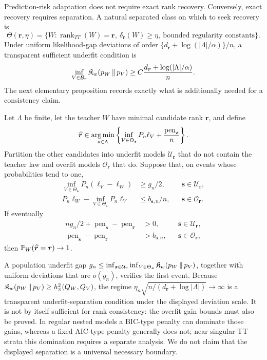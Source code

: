 Prediction-risk adaptation does not require exact rank recovery. Conversely,
exact recovery requires separation. A natural separated class on which to
seek recovery is
\[
\Theta(\bm r,\eta)=\{W:\operatorname{rank}_{TT}(W)=\bm r,
\ \delta_{\bm r}(W)\ge\eta,\ \text{bounded regularity constants}\}.
\]
Under uniform likelihood-gap deviations of order
\(\{d_{\bm r}+\log(|\Lambda|/\alpha)\}/n\), a transparent sufficient
underfit condition is
\[
\inf_{V\in\mathcal B_{\bm r}}\mathfrak K_w\!\left(p_W\,\middle\|\,p_V\right)
\ge C\frac{d_{\bm r}+\log(|\Lambda|/\alpha)}{n}.
\]
The next elementary proposition records exactly what is additionally needed
for a consistency claim.

\begin{proposition}
\label{prop:rank-sufficiency}
Let \(\Lambda\) be finite, let the teacher \(W\) have minimal candidate rank
\(\bm r\), and define
\[
 \widehat{\bm r}\in\operatorname*{arg\,min}_{\bm s\in\Lambda}
 \left\{\inf_{V\in\Theta_{\bm s}}P_n\ell_V
       +\frac{\operatorname{pen}_{\bm s}}n\right\}.
\]
Partition the other candidates into underfit models \(\mathcal U_{\bm r}\)
that do not contain the teacher law and overfit models
\(\mathcal O_{\bm r}\) that do.  Suppose that, on events whose probabilities
tend to one,
\begin{align*}
 \inf_{V\in\Theta_{\bm s}}P_n(\ell_V-\ell_W)&\ge g_n/2,
 &&\bm s\in\mathcal U_{\bm r},\\
 P_n\ell_W-\inf_{V\in\Theta_{\bm s}}P_n\ell_V&\le b_{\bm s,n}/n,
 &&\bm s\in\mathcal O_{\bm r}.
\end{align*}
If eventually
\begin{align*}
 ng_n/2+\operatorname{pen}_{\bm s}-
 \operatorname{pen}_{\bm r}&>0,
 &&\bm s\in\mathcal U_{\bm r},\\
 \operatorname{pen}_{\bm s}-\operatorname{pen}_{\bm r}
 &>b_{\bm s,n},
 &&\bm s\in\mathcal O_{\bm r},
\end{align*}
then \(\mathbb P_W(\widehat{\bm r}=\bm r)\to1\).
\end{proposition}

A population underfit gap
\(g_n\le\inf_{\bm s\in\mathcal U_{\bm r}}
\inf_{V\in\Theta_{\bm s}}\mathfrak K_w\!\left(p_W\,\middle\|\,p_V\right)\), together with uniform deviations
that are \(o(g_n)\), verifies the first event.  Because
\(\mathfrak K_w\!\left(p_W\,\middle\|\,p_V\right)\ge h_\pi^2(Q_W,Q_V)\), the regime
\(\eta_n\sqrt{n/(d_{\bm r}+\log|\Lambda|)}\to\infty\) is a transparent
underfit-separation condition under the displayed deviation scale.  It is not
by itself sufficient for rank consistency: the overfit-gain bounds must also
be proved.  In regular nested models a BIC-type penalty can dominate those
gains, whereas a fixed AIC-type penalty generally does not; near singular TT
strata this domination requires a separate analysis.  We do not claim that
the displayed separation is a universal necessary boundary.
